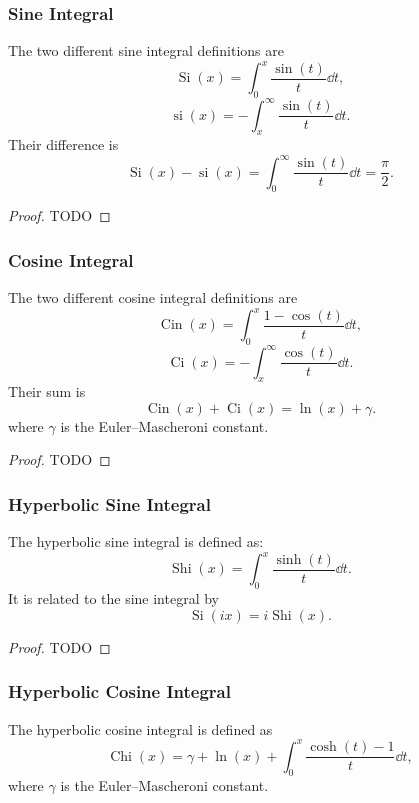 \subsubsection{Sine Integral}
The two different sine integral definitions are
\[\operatorname{Si}(x)=\int_0^x\frac{\sin(t)}{t}\dd{t},\]
\[\operatorname{si}(x)=-\int_x^\infty\frac{\sin(t)}{t}\dd{t}.\]
Their difference is
\[\operatorname{Si}(x)-\operatorname{si}(x)=\int_0^\infty\frac{\sin(t)}{t}\dd{t}=\frac{\pi}{2}.\]
\begin{proof}
TODO
\end{proof}
\subsubsection{Cosine Integral}
The two different cosine integral definitions are
\[\operatorname{Cin}(x)=\int_0^x\frac{1-\cos(t)}{t}\dd{t},\]
\[\operatorname{Ci}(x)=-\int_x^\infty\frac{\cos(t)}{t}\dd{t}.\]
Their sum is
\[\operatorname{Cin}(x)+\operatorname{Ci}(x)=\ln(x)+\gamma.\]
where $\gamma$ is the Euler–Mascheroni constant.
\begin{proof}
TODO
\end{proof}
\subsubsection{Hyperbolic Sine Integral}
The hyperbolic sine integral is defined as:
\[\operatorname{Shi}(x)=\int_0^x\frac{\sinh(t)}{t}\dd{t}.\]
It is related to the sine integral by
\[\operatorname{Si}(ix)=i\operatorname{Shi}(x).\]
\begin{proof}
TODO
\end{proof}
\subsubsection{Hyperbolic Cosine Integral}
The hyperbolic cosine integral is defined as
\[\operatorname{Chi}(x)=\gamma+\ln(x)+\int_0^x\frac{\cosh(t)-1}{t}\dd{t},\]
where $\gamma$ is the Euler–Mascheroni constant.

